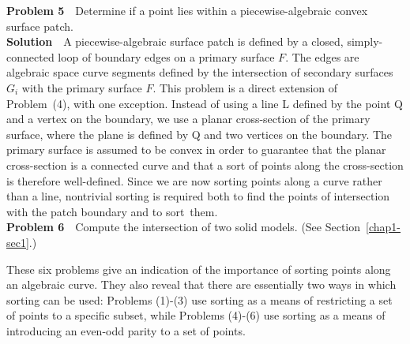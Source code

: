 %
{\bf Problem 5}\ \
Determine if a point lies within a 
piecewise-algebraic convex surface patch.\\
%
{\bf Solution}\ \ 
A piecewise-algebraic surface patch is defined by a closed, 
simply-connected loop of boundary edges on a primary surface $F$. 
The edges are algebraic space curve segments defined by the intersection
of secondary surfaces $G_{i}$ with the primary surface $F$.
This problem is a direct extension of Problem~(4), with one exception.
Instead of using a line L defined by the point Q and a vertex on the boundary,
we use a planar cross-section of the primary surface, where the plane is defined
by Q and two vertices on the boundary.
The primary surface is assumed to be convex in order to guarantee that the planar cross-section
is a connected curve and that a sort of points along the cross-section is 
therefore well-defined.
Since we are now sorting points along a curve rather than a line, nontrivial
sorting is required both to find the points of intersection with the patch
boundary and to sort\vspace{.5in}~them.\\
%
{\bf Problem 6}\ \
Compute the intersection of two solid models.  
(See Section\vspace{.5in}~\ref{chap1-sec1}.)
%
%

These six problems give an indication of the importance of 
sorting points along an algebraic curve.
They also reveal that there are essentially two ways in which sorting can
be used:
Problems (1)-(3) use sorting as a means of restricting
a set of points to a specific subset, while Problems (4)-(6) use sorting
as a means of introducing an even-odd parity to a set of points.
%
